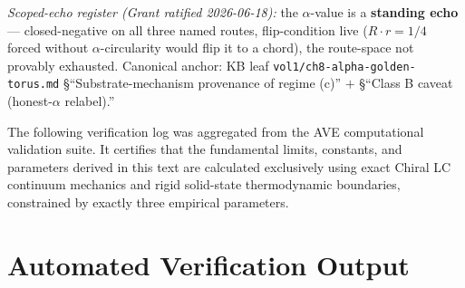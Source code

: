 \emph{Scoped-echo register (Grant ratified 2026-06-18):} the $\alpha$-value is a \textbf{standing echo} --- closed-negative on all three named routes, flip-condition live ($R \cdot r = 1/4$ forced without $\alpha$-circularity would flip it to a chord), the route-space not provably exhausted. Canonical anchor: KB leaf \texttt{vol1/ch8-alpha-golden-torus.md} \S``Substrate-mechanism provenance of regime (c)'' $+$ \S``Class B caveat (honest-$\alpha$ relabel).''

The following verification log was aggregated from the AVE computational validation suite. It certifies that the fundamental limits, constants, and parameters derived in this text are calculated exclusively using exact Chiral LC continuum mechanics and rigid solid-state thermodynamic boundaries, constrained by exactly three empirical parameters.

\section*{Automated Verification Output}

